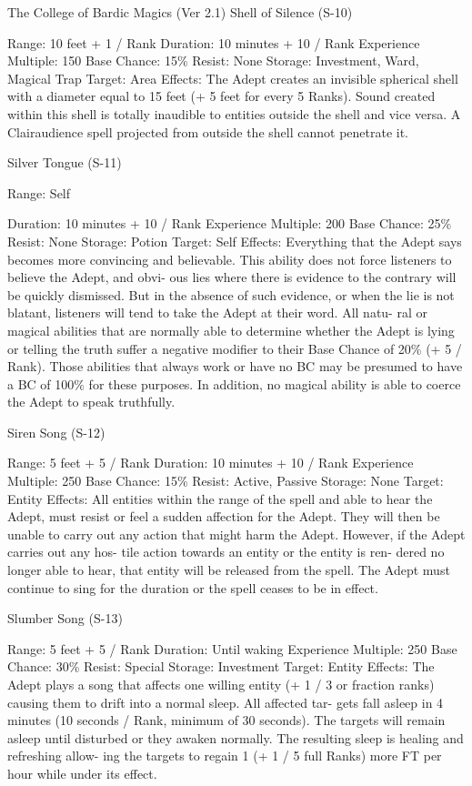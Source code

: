 \begin{Chapter}{The College of Bardic Magics (Ver 2.1)}
Shell of Silence (S-10) 

Range: 10 feet + 1 / Rank 
Duration: 10 minutes + 10 / Rank 
Experience Multiple: 150 
Base Chance: 15\% 
Resist: None 
Storage: Investment, Ward, Magical Trap 
Target: Area 
Effects:  The  Adept  creates  an  invisible  spherical 
shell  with a diameter equal to 15 feet (+ 5 feet for 
every  5  Ranks).  Sound  created  within  this  shell  is 
totally  inaudible  to  entities  outside  the  shell  and 
vice  versa.  A  Clairaudience  spell  projected  from 
outside the shell cannot penetrate it. 

Silver Tongue (S-11) 

Range: Self 

Duration: 10 minutes + 10 / Rank 
Experience Multiple: 200 
Base Chance: 25\% 
Resist: None 
Storage: Potion 
Target: Self 
Effects:  Everything  that  the  Adept  says  becomes 
more  convincing  and  believable.  This  ability  does 
not  force  listeners  to  believe  the  Adept,  and  obvi-
ous lies where there is evidence to the contrary will 
be  quickly  dismissed.  But  in  the  absence  of  such 
evidence,  or  when  the  lie  is  not  blatant,  listeners 
will tend to take the Adept at their word. All natu-
ral  or  magical  abilities  that  are  normally  able  to 
determine whether the Adept is lying or telling the 
truth  suffer  a  negative  modifier  to  their  Base 
Chance  of  20\%  (+  5  /  Rank).  Those  abilities  that 
always  work  or  have  no  BC  may  be  presumed  to 
have a BC of 100\% for these purposes. In addition, 
no  magical  ability  is  able  to  coerce  the  Adept  to 
speak truthfully. 

Siren Song (S-12) 

Range: 5 feet + 5 / Rank 
Duration: 10 minutes + 10 / Rank 
Experience Multiple: 250 
Base Chance: 15\% 
Resist: Active, Passive 
Storage: None 
Target: Entity 
Effects:  All  entities  within  the  range  of  the  spell 
and  able  to  hear  the  Adept,  must  resist  or  feel  a 
sudden  affection  for  the  Adept.  They  will  then  be 
unable to carry out any action that might harm the 
Adept. However, if the  Adept carries out any hos-
tile  action  towards  an  entity  or  the  entity  is  ren-
dered  no  longer  able  to  hear,  that  entity  will  be 
released  from  the  spell.  The  Adept  must  continue 
to sing for the duration or the spell ceases to be in 
effect. 

Slumber Song (S-13) 

Range: 5 feet + 5 / Rank 
Duration: Until waking 
Experience Multiple: 250 
Base Chance: 30\% 
Resist: Special 
Storage: Investment 
Target: Entity 
Effects:  The  Adept  plays  a  song  that  affects  one 
willing  entity  (+  1  /  3  or  fraction  ranks)  causing 
them to  drift into  a  normal  sleep.  All  affected  tar-
gets  fall  asleep  in  4  minutes  (10  seconds  /  Rank, 
minimum  of  30  seconds).  The  targets  will  remain 
asleep  until  disturbed  or  they  awaken  normally. 
The resulting sleep is healing and refreshing allow-
ing the targets to regain 1 (+ 1 / 5 full Ranks) more 
FT per hour while under its effect. 


\end{Chapter}
